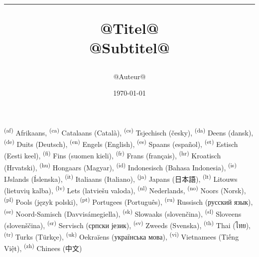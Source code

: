 \documentclass[onecolumn,a4paper,10pt]{report}
\begin{document}
\sffamily
\raggedbottom
\title{\color{kleur}\bfseries\Huge \begin{shaded*} \hrule @Titel@ %
\\[1ex] \large @Subtitel@ %
\end{shaded*}}
\author{\color{kleur}@Auteur@}
\vfill
\date{\color{kleur}\today{}}

\maketitle

\setcounter{page}{1}

\tableofcontents
\newpage
\setcounter{page}{1}
\textsuperscript{(af)}  Afrikaans,
\textsuperscript{(ca)} Catalaans (Català),
\textsuperscript{(cs)}  Tsjechisch (česky),
\textsuperscript{(da)}  Deens (dansk),
\textsuperscript{(de)}  Duits (Deutsch),
\textsuperscript{(en)}  Engels (English),
\textsuperscript{(es)}  Spaans (español),
\textsuperscript{(et)}  Estisch (Eesti keel),
\textsuperscript{(fi)}  Fins (suomen kieli),
\textsuperscript{(fr)}  Frans (français),
\textsuperscript{(hr)}  Kroatisch (Hrvatski),
\textsuperscript{(hu)}  Hongaars (Magyar),
\textsuperscript{(id)}  Indonesisch (Bahasa Indonesia),
\textsuperscript{(is)}  IJslands (Íslenska),
\textsuperscript{(it)}  Italiaans (Italiano),
\textsuperscript{(ja)}  Japans (日本語),
\textsuperscript{(lt)}  Litouws (lietuvių kalba),
\textsuperscript{(lv)}  Lets (latviešu valoda),
\textsuperscript{(nl)}  Nederlands,
\textsuperscript{(no)}  Noors (Norsk),
\textsuperscript{(pl)}  Pools (język polski),
\textsuperscript{(pt)}  Portugees (Português),
\textsuperscript{(ru)}  Russisch (русский язык),
\textsuperscript{(se)} Noord-Samisch (Davvisámegiella),
\textsuperscript{(sk)}  Slowaaks (slovenčina),
\textsuperscript{(sl)}  Sloveens (slovenščina),
\textsuperscript{(sr)}  Servisch (српски језик),
\textsuperscript{(sv)}  Zweeds (Svenska),
\textsuperscript{(th)}  Thai (\foreignlanguage{thai}{ไทย}),
\textsuperscript{(tr)}  Turks (Türkçe),
\textsuperscript{(uk)}  Oekraïens (українська мова),
\textsuperscript{(vi)}  Vietnamees (Tiếng Việt),
\textsuperscript{(zh)}  Chinees (中文)

\newpage

\end{document}
